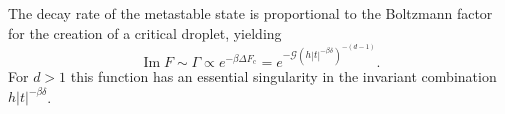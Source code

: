 \documentclass[aps,prl,preprint]{revtex4-1}
\def\[{\begin{equation}}
\def\]{\end{equation}}
\def\im{\mathop{\mathrm{Im}}\nolimits}
\def\c{\mathrm c}
\def\fM{\mathcal M}  %
\def\fS{\mathcal S}  %
\def\fG{\mathcal G}  %
\def\sq{\mathrm{sq}}
\def\dim{d}
\begin{document}
The decay rate of the metastable state is proportional to the Boltzmann factor
for the creation of a critical droplet, yielding
\[
  \im F\sim\Gamma\propto e^{-\beta\Delta F_\c}=e^{-\fG(h|t|^{-\beta\delta})^{-(\dim-1)}}.
\]
For $d>1$ this function has an essential singularity in the invariant
combination $h|t|^{-\beta\delta}$.

\end{document}
